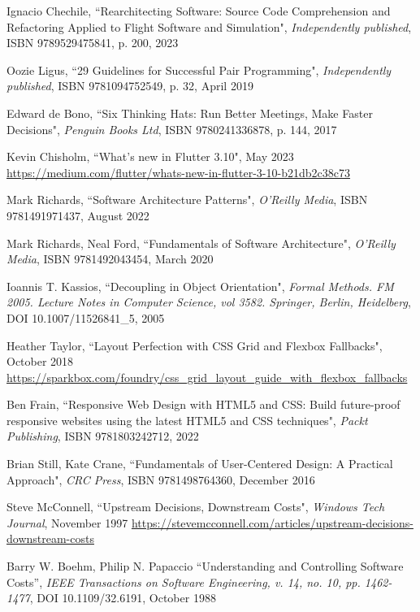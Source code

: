 \begin{thebibliography}{100}
 Ignacio Chechile, ``Rearchitecting Software: Source Code Comprehension and Refactoring 
Applied to Flight Software and Simulation", \emph{Independently published}, ISBN 9789529475841, p. 200, 2023

 Oozie Ligus, ``29 Guidelines for Successful Pair Programming", \emph{Independently published},
ISBN 9781094752549, p. 32,  April 2019

 Edward de Bono, ``Six Thinking Hats: Run Better Meetings, Make Faster Decisions",
\emph{Penguin Books Ltd}, ISBN 9780241336878, p. 144, 2017

 Kevin Chisholm, ``What's new in Flutter 3.10", May 2023
\href{https://medium.com/flutter/whats-new-in-flutter-3-10-b21db2c38c73}{https://medium.com/flutter/whats-new-in-flutter-3-10-b21db2c38c73}

 Mark Richards, ``Software Architecture Patterns", 
\emph{O'Reilly Media}, ISBN 9781491971437, August 2022

 Mark Richards, Neal Ford, ``Fundamentals of Software Architecture",
\emph{O'Reilly Media}, ISBN 9781492043454, March 2020  

 Ioannis T. Kassios, ``Decoupling in Object Orientation", \emph{Formal Methods. FM 2005. 
Lecture Notes in Computer Science, vol 3582. Springer, Berlin, Heidelberg}, DOI 10.1007/11526841\_5, 2005

 Heather Taylor, ``Layout Perfection with CSS Grid and Flexbox Fallbacks", October 2018
\href{https://sparkbox.com/foundry/css_grid_layout_guide_with_flexbox_fallbacks}{https://sparkbox.com/foundry/css\_grid\_layout\_guide\_with\_flexbox\_fallbacks}

 Ben Frain, ``Responsive Web Design with HTML5 and CSS: Build future-proof responsive 
websites using the latest HTML5 and CSS techniques", \emph{Packt Publishing}, ISBN 9781803242712, 2022

 Brian Still, Kate Crane, ``Fundamentals of User-Centered Design: A Practical Approach", 
\emph{CRC Press}, ISBN 9781498764360, December 2016

 Steve McConnell, ``Upstream Decisions, Downstream Costs", \emph{Windows Tech Journal}, November 1997
\href{https://stevemcconnell.com/articles/upstream-decisions-downstream-costs}{https://stevemcconnell.com/articles/upstream-decisions-downstream-costs}

 Barry W. Boehm, Philip N. Papaccio ``Understanding and Controlling Software Costs”,
\emph{IEEE Transactions on Software Engineering, v. 14, no. 10, pp. 1462-1477}, DOI 10.1109/32.6191, October 1988



\end{thebibliography}
